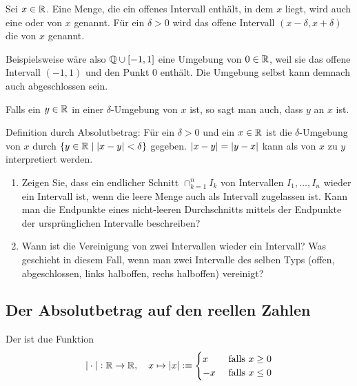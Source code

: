 \begin{mydef} Sei $x \in \mathbb{R}$. Eine Menge, die ein offenes Intervall enthält, in dem $x$ liegt, wird auch eine  oder  von $x$ genannt. Für ein $\delta > 0$ wird das offene Intervall $(x-\delta, x + \delta)$ die  von $x$ genannt.

Beispielsweise wäre also $\mathbb{Q} \cup [-1,1]$ eine Umgebung von $0 \in \mathbb{R}$, weil sie das offene Intervall $(-1,1)$ und den Punkt $0$ enthält. Die Umgebung selbst kann demnach auch abgeschlossen sein.

Falls ein $y \in \mathbb{R}$ in einer $\delta$-Umgebung von $x$ ist, so sagt man auch, dass $y$  an $x$ ist.

Definition durch Absolutbetrag: Für ein $\delta > 0$ und ein $x \in \mathbb{R}$ ist die $\delta$-Umgebung von $x$ durch $\{y \in \mathbb{R} \mid \left|x-y\right| < \delta \}$ gegeben. $\left|x-y\right| = \left|y-x\right|$ kann als  von $x$ zu $y$ interpretiert werden.

\end{mydef}

\begin{ex}
  \phantom{.}
  \begin{enumerate}
    \item Zeigen Sie, dass ein endlicher Schnitt $\cap _{k=1}^{n}I_k$ von Intervallen $I_1, \dots, I_n$ wieder ein Intervall ist, wenn die leere Menge auch als Intervall zugelassen ist. Kann man die Endpunkte eines nicht-leeren Durchschnitts mittels der Endpunkte der ursprünglichen Intervalle beschreiben?
    \item Wann ist die Vereinigung von zwei Intervallen wieder ein Intervall? Was geschieht in diesem Fall, wenn man zwei Intervalle des selben Typs (offen, abgeschlossen, links halboffen, rechs halboffen) vereinigt?
  \end{enumerate}
\end{ex}

\subsection{Der Absolutbetrag auf den reellen Zahlen}
\begin{mydef}[Absolutbetrag] Der  ist due Funktion
  \[| \cdot | : \mathbb{R} \to \mathbb{R}, \quad x \mapsto |x| :\equiv
  \begin{cases}
    x & \text{ falls } x \geq 0 \\
    -x & \text{ falls } x \leq 0
  \end{cases}\]
\end{mydef}

